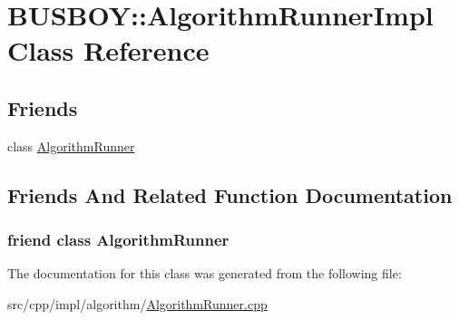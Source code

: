 \hypertarget{classBUSBOY_1_1AlgorithmRunnerImpl}{
\section{BUSBOY::AlgorithmRunnerImpl Class Reference}
\label{classBUSBOY_1_1AlgorithmRunnerImpl}
}
\subsection*{Friends}
\begin{DoxyCompactItemize}
\item 
class \hyperlink{classBUSBOY_1_1AlgorithmRunnerImpl_a05a0644d71a2b55a9d4a779a1b41177a}{AlgorithmRunner}
\end{DoxyCompactItemize}


\subsection{Friends And Related Function Documentation}
\hypertarget{classBUSBOY_1_1AlgorithmRunnerImpl_a05a0644d71a2b55a9d4a779a1b41177a}{
\subsubsection[{AlgorithmRunner}]{\setlength{\rightskip}{0pt plus 5cm}friend class {\bf AlgorithmRunner}}}
\label{classBUSBOY_1_1AlgorithmRunnerImpl_a05a0644d71a2b55a9d4a779a1b41177a}


The documentation for this class was generated from the following file:\begin{DoxyCompactItemize}
\item 
src/cpp/impl/algorithm/\hyperlink{AlgorithmRunner_8cpp}{AlgorithmRunner.cpp}\end{DoxyCompactItemize}

